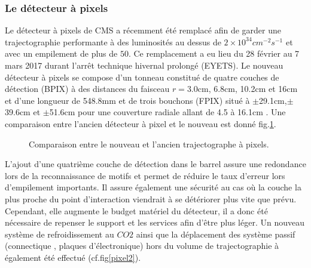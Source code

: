 \subsubsection{Le détecteur à pixels}
Le détecteur à pixels de CMS a récemment été remplacé afin de garder une trajectographie performante à des luminosités au dessus de $2\times10^{34}cm^{-2}s^{-1}$ et avec un empilement de plus de $50$. Ce remplacement a eu lieu du 28 février au 7 mars 2017 durant l'arrêt technique hivernal prolongé (EYETS). Le nouveau détecteur à pixels se compose d'un tonneau constitué de quatre couches de détection (BPIX) à des distances du faisceau $r=3.0$cm, 6.8cm, 10.2cm et 16cm et d'une longueur de 548.8mm et de trois bouchons (FPIX) situé à $\pm$29.1cm,$\pm$39.6cm et $\pm$51.6cm pour une couverture radiale allant de 4.5 à 16.1cm . Une comparaison entre l'ancien détecteur à pixel et le nouveau est donné fig.\ref{pixel}.

	\begin{figure}[ht!]
	\hfill
	\caption{Comparaison entre le nouveau et l'ancien trajectographe à pixels.}
	\label{pixel}
\end{figure}

L'ajout d'une quatrième couche de détection dans le barrel assure une redondance lors de la reconnaissance de motifs et permet de réduire le taux d'erreur lors d'empilement importants. Il assure également une sécurité au cas où la couche la plus proche du point d'interaction viendrait à se détériorer plus vite que prévu. Cependant, elle augmente le budget matériel du détecteur, il a donc été nécessaire de repenser le support et les services afin d'être plus léger. Un nouveau système de refroidissement au $CO2$ ainsi que la déplacement des système passif (connectique , plaques d'électronique) hors du volume de trajectographie à également été effectué (cf.fig\ref{pixel2}).

